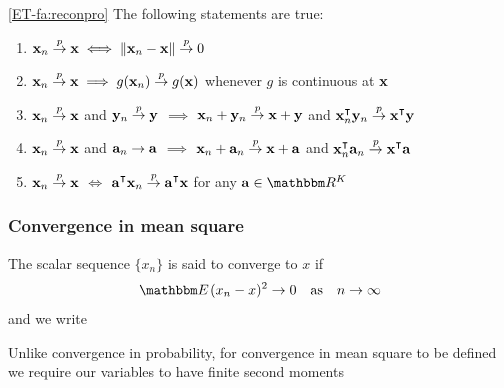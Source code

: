 \begin{frame}

    \vspace{2em}
    \Fact\eqref{ET-fa:reconpro}
    The following statements are true:
    \begin{enumerate}
        \item ${\mathbf x}_n \stackrel { p } {\to} {\mathbf x} \iff \| {\mathbf x}_n - {\mathbf x} \| \stackrel { p } {\to}
            0$
        \item ${\mathbf x}_n \stackrel { p } {\to} {\mathbf x} \implies g({\mathbf x}_n) \stackrel { p } {\to} g({\mathbf x})$
            whenever $g$ is continuous at ${\mathbf x}$
        \item ${\mathbf x}_n \stackrel { p } {\to} {\mathbf x}$ and ${\mathbf y}_n \stackrel { p } {\to} {\mathbf y}$
            $\implies$ ${\mathbf x}_n + {\mathbf y}_n \stackrel { p } {\to}
            {\mathbf x} + {\mathbf y}$ and $\boldx_n^\T \boldy_n \toprob \boldx^\T
            \boldy$
        \item ${\mathbf x}_n \stackrel { p } {\to} {\mathbf x}$ and ${\mathbf a}_n \to {\mathbf a}$ $\implies$
            ${\mathbf x}_n + {\mathbf a}_n \stackrel { p } {\to}
            {\mathbf x} + {\mathbf a}$ and $\boldx_n^\T \bolda_n \toprob \boldx^\T
            \bolda$
        \item ${\mathbf x}_n \stackrel { p } {\to} {\mathbf x}$ $\iff$ $\bolda^\T \boldx_n \toprob \bolda^\T \boldx$ for any $\bolda \in \RR^K$
    \end{enumerate}
    
\end{frame}

\begin{frame}\frametitle{Convergence in mean square}
    
    \vspace{2em}
    The scalar sequence $\{x_n\}$ is said to converge to $x$  
    if
    \begin{equation}
        \label{eq:cims}
        \EE (x_n - x)^2   \to 0 
        \quad \text{as} \quad n \to \infty
    \end{equation}
    and we write 
    
    \vspace{1em}
    Unlike convergence in probability, for
    convergence in mean square to be defined we require our variables to have
    finite second moments
    
\end{frame}

